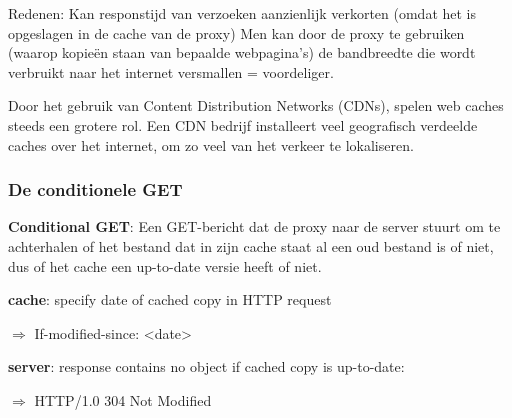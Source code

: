 \noindent Redenen:
\bi
\itf Kan responstijd van verzoeken aanzienlijk verkorten (omdat het is opgeslagen in de cache van de proxy)
\itf Men kan door de proxy te gebruiken (waarop kopieën staan van bepaalde webpagina’s) de bandbreedte die wordt verbruikt naar het internet versmallen = voordeliger.
\ei

\noindent Door het gebruik van Content Distribution Networks (CDNs), spelen web caches steeds een grotere rol. Een CDN bedrijf installeert veel geografisch verdeelde caches over het internet, om zo veel van het verkeer te lokaliseren.

\subsubsection{De conditionele GET}

\textbf{Conditional GET}: Een GET-bericht dat de proxy naar de server stuurt om te achterhalen of het bestand dat in zijn cache staat al een oud bestand is of niet, dus of het cache een up-to-date versie heeft of niet.

\textbf{cache}: specify date of cached copy in HTTP request

$\Rightarrow$ If-modified-since: <date>

\textbf{server}: response contains no object if cached copy is up-to-date:

$\Rightarrow$ HTTP/1.0 304 Not Modified
